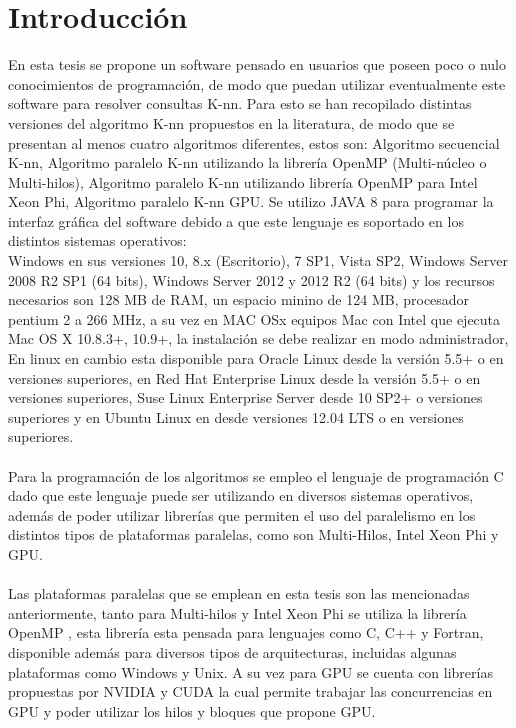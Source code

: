 \chapter[Introducción]{\label{ch:intro}Introducción}

En esta tesis se propone un software pensado en usuarios que poseen poco o nulo conocimientos de programación, de modo que puedan utilizar eventualmente este software para resolver consultas K-nn. Para esto se han recopilado distintas versiones del algoritmo K-nn propuestos en la literatura, de modo que se presentan al menos cuatro algoritmos diferentes, estos son: Algoritmo secuencial K-nn, Algoritmo paralelo K-nn utilizando la librería OpenMP (Multi-núcleo o  Multi-hilos), Algoritmo paralelo K-nn utilizando librería OpenMP para Intel Xeon Phi, Algoritmo paralelo K-nn GPU.
Se utilizo JAVA 8 \cite{java} para programar la interfaz gráfica del software debido a que este lenguaje es soportado en los distintos sistemas operativos:
\\Windows en sus versiones 10, 8.x (Escritorio), 7 SP1, Vista SP2, Windows Server 2008 R2 SP1 (64 bits), Windows Server 2012 y 2012 R2 (64 bits) y los recursos necesarios son 128 MB de RAM, un espacio minino de 124 MB, procesador pentium 2 a 266 MHz, a su vez en MAC OSx equipos Mac con Intel que ejecuta Mac OS X 10.8.3+, 10.9+, la instalación se debe realizar en modo administrador, En linux en cambio esta disponible para Oracle Linux desde la versión 5.5+ o en versiones superiores, en Red Hat Enterprise Linux desde la versión 5.5+ o en versiones superiores, Suse Linux Enterprise Server desde 10 SP2+ o versiones superiores y en Ubuntu Linux en desde versiones 12.04 LTS o en versiones superiores.\\
\\
Para la programación de los algoritmos se empleo el lenguaje de programación C \cite{c} dado que este lenguaje puede ser utilizando en diversos sistemas operativos, además de poder utilizar librerías que permiten el uso del paralelismo en los distintos tipos de plataformas paralelas, como son Multi-Hilos, Intel Xeon Phi y GPU.\\
\\
Las plataformas paralelas que se emplean en esta tesis son las mencionadas anteriormente, tanto para Multi-hilos y Intel Xeon Phi se utiliza la librería OpenMP \cite{libroOpenMP}\cite{libroPthreads}, esta librería esta pensada para lenguajes como C, C++ y Fortran, disponible además para diversos tipos de arquitecturas, incluidas algunas plataformas como Windows y Unix.
A su vez para GPU se cuenta con librerías propuestas por NVIDIA y CUDA \cite{cuda} la cual permite trabajar las concurrencias en GPU y poder utilizar los hilos y bloques que propone GPU.   


